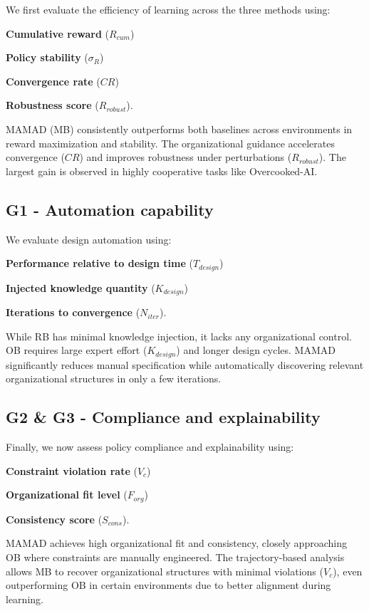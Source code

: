 \documentclass[pdflatex,sn-mathphys-num]{sn-jnl}%
\theoremstyle{thmstyleone}%
\theoremstyle{thmstyletwo}%
\theoremstyle{thmstylethree}%
\begin{document}
We first evaluate the efficiency of learning across the three methods using:
%
\begin{enumerate*}[label={\roman*)}, itemjoin={; \quad}]
    \item \textbf{Cumulative reward} ($R_{cum}$)
    \item \textbf{Policy stability} ($\sigma_R$)
    \item \textbf{Convergence rate} ($CR$)
    \item \textbf{Robustness score} ($R_{robust}$).
\end{enumerate*}
%
MAMAD (MB) consistently outperforms both baselines across environments in reward maximization and stability. The organizational guidance accelerates convergence ($CR$) and improves robustness under perturbations ($R_{robust}$). The largest gain is observed in highly cooperative tasks like Overcooked-AI.

\subsection{G1 - Automation capability}

We evaluate design automation using:
%
\begin{enumerate*}[label={\roman*)}, itemjoin={; \quad}]
    \item \textbf{Performance relative to design time} ($T_{design}$)
    \item \textbf{Injected knowledge quantity} ($K_{design}$)
    \item \textbf{Iterations to convergence} ($N_{iter}$).
\end{enumerate*}
%
While RB has minimal knowledge injection, it lacks any organizational control. OB requires large expert effort ($K_{design}$) and longer design cycles. MAMAD significantly reduces manual specification while automatically discovering relevant organizational structures in only a few iterations.

\subsection{G2 \& G3 - Compliance and explainability}

Finally, we now assess policy compliance and explainability using:
%
\begin{enumerate*}[label={\roman*)}, itemjoin={; \quad}]
    \item \textbf{Constraint violation rate} ($V_c$)
    \item \textbf{Organizational fit level} ($F_{org}$)
    \item \textbf{Consistency score} ($S_{cons}$).
\end{enumerate*}
%
MAMAD achieves high organizational fit and consistency, closely approaching OB where constraints are manually engineered. The trajectory-based analysis allows MB to recover organizational structures with minimal violations ($V_c$), even outperforming OB in certain environments due to better alignment during learning.
\end{document}
